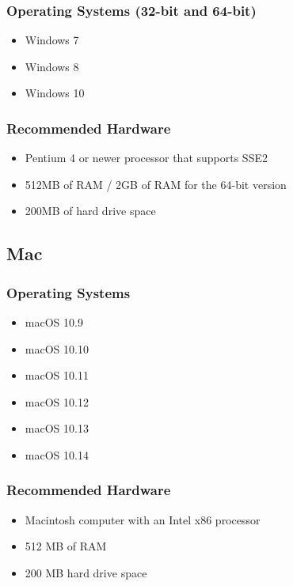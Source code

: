 \documentclass{article}
\begin{document}
\subsubsection*{Operating Systems (32-bit and
  64-bit)}\label{operating-systems-32-bit-and-64-bit}

\begin{itemize}
\item Windows 7
\item Windows 8
\item Windows 10
\end{itemize}

\subsubsection*{Recommended Hardware}\label{recommended-hardware}

\begin{itemize}
\item Pentium 4 or newer processor that supports SSE2
\item 512MB of RAM / 2GB of RAM for the 64-bit version
\item 200MB of hard drive space
\end{itemize}

\subsection*{Mac}\label{mac}

\subsubsection*{Operating Systems}\label{operating-systems}

\begin{itemize}
\item macOS 10.9
\item macOS 10.10
\item macOS 10.11
\item macOS 10.12
\item macOS 10.13
\item macOS 10.14
\end{itemize}

\subsubsection*{Recommended Hardware}\label{recommended-hardware_1}

\begin{itemize}
\item Macintosh computer with an Intel x86 processor
\item 512 MB of RAM
\item 200 MB hard drive space
\end{itemize}
\end{document}
